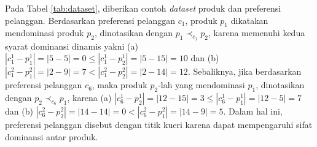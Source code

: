 Pada Tabel \ref{tab:dataset}, diberikan contoh \textit{dataset} produk dan preferensi pelanggan. Berdasarkan preferensi pelanggan $c_1$, produk $p_1$ dikatakan mendominasi produk $p_2$, dinotasikan dengan $p_1 \prec_{c_1} p_2$, karena memenuhi kedua syarat dominansi dinamis yakni (a) $|c_1^1 - p_1^1| = |5-5| = 0 \leq |c_1^1 - p_2^1| = |5-15| = 10$ dan (b) $|c_1^2 - p_1^2| = |2-9| = 7 < |c_1^2 - p_2^2| = |2-14| = 12$. Sebaliknya, jika berdasarkan preferensi pelanggan $c_6$, maka produk $p_2$-lah yang mendominasi $p_1$, dinotasikan dengan $p_2 \prec_{c_6} p_1$, karena (a) $|c_6^1 - p_2^1| = |12-15| = 3 \leq |c_6^1 - p_1^1| = |12-5| = 7$ dan (b) $|c_6^2 - p_2^2| = |14-14| = 0 < |c_6^2 - p_1^2| = |14-9| = 5$. Dalam hal ini, preferensi pelanggan disebut dengan titik kueri karena dapat mempengaruhi sifat dominansi antar produk.

